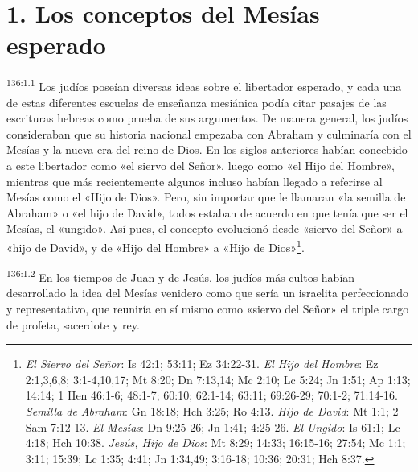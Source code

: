 \section*{1. Los conceptos del Mesías esperado}
\par
\textsuperscript{136:1.1} Los judíos poseían diversas ideas sobre el libertador esperado, y cada una de estas diferentes escuelas de enseñanza mesiánica podía citar pasajes de las escrituras hebreas como prueba de sus argumentos. De manera general, los judíos consideraban que su historia nacional empezaba con Abraham y culminaría con el Mesías y la nueva era del reino de Dios. En los siglos anteriores habían concebido a este libertador como «el siervo del Señor», luego como «el Hijo del Hombre», mientras que más recientemente algunos incluso habían llegado a referirse al Mesías como el «Hijo de Dios». Pero, sin importar que le llamaran «la semilla de Abraham» o «el hijo de David», todos estaban de acuerdo en que tenía que ser el Mesías, el «ungido». Así pues, el concepto evolucionó desde «siervo del Señor» a «hijo de David», y de «Hijo del Hombre» a «Hijo de Dios»\footnote{\textit{El Siervo del Señor}: Is 42:1; 53:11; Ez 34:22-31. \textit{El Hijo del Hombre}: Ez 2:1,3,6,8; 3:1-4,10,17; Mt 8:20; Dn 7:13,14; Mc 2:10; Lc 5:24; Jn 1:51; Ap 1:13; 14:14; 1 Hen 46:1-6; 48:1-7; 60:10; 62:1-14; 63:11; 69:26-29; 70:1-2; 71:14-16. \textit{Semilla de Abraham}: Gn 18:18; Hch 3:25; Ro 4:13. \textit{Hijo de David}: Mt 1:1; 2 Sam 7:12-13. \textit{El Mesías}: Dn 9:25-26; Jn 1:41; 4:25-26. \textit{El Ungido}: Is 61:1; Lc 4:18; Hch 10:38. \textit{Jesús, Hijo de Dios}: Mt 8:29; 14:33; 16:15-16; 27:54; Mc 1:1; 3:11; 15:39; Lc 1:35; 4:41; Jn 1:34,49; 3:16-18; 10:36; 20:31; Hch 8:37.}.

\par
\textsuperscript{136:1.2} En los tiempos de Juan y de Jesús, los judíos más cultos habían desarrollado la idea del Mesías venidero como que sería un israelita perfeccionado y representativo, que reuniría en sí mismo como «siervo del Señor» el triple cargo de profeta, sacerdote y rey.

